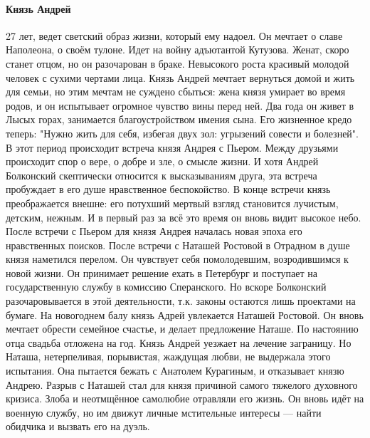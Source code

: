 \documentclass{article}
\begin{document}
\paragraph{Князь Андрей}
27 лет, ведет светский образ жизни, который ему надоел. Он мечтает о славе Наполеона, о своём тулоне.
Идет на войну адъютантой Кутузова. Женат, скоро станет отцом, но он разочарован в браке. Невысокого роста
красивый молодой человек с сухими чертами лица. Князь Андрей мечтает вернуться домой и жить для семьи, но
этим мечтам не суждено сбыться: жена князя умирает во время родов, и он испытывает огромное чувство вины перед ней.
Два года он живет в Лысых горах, занимается благоустройством имения сына. Его жизненное кредо теперь:
"Нужно жить для себя, избегая двух зол: угрызений совести и болезней". В этот период происходит встреча князя
Андрея с Пьером. Между друзьями происходит спор о вере, о добре и зле, о смысле жизни. И хотя Андрей Болконский
скептически относится к высказываниям друга, эта встреча пробуждает в его душе нравственное беспокойство.
В конце встречи князь преображается внешне: его потухший мертвый взгляд становится лучистым, детским, нежным.
И в первый раз за всё это время он вновь видит высокое небо. После встречи с Пьером для князя Андрея началась
новая эпоха его нравственных поисков. После встречи с Наташей Ростовой в Отрадном в душе князя наметился перелом.
Он чувствует себя помолодевшим, возродившимся к новой жизни. Он принимает решение ехать в Петербург и поступает
на государственную службу в комиссию Сперанского. Но вскоре Болконский разочаровывается в этой деятельности, т.к.
законы остаются лишь проектами на бумаге. На новогоднем балу князь Адрей увлекается Наташей Ростовой.
Он вновь мечтает обрести семейное счастье, и делает предложение Наташе. По настоянию отца свадьба отложена на год.
Князь Андрей уезжает на лечение заграницу. Но Наташа, нетерпеливая, порывистая, жаждущая любви, не выдержала этого
испытания. Она пытается бежать с Анатолем Курагиным, и отказывает князю Андрею. Разрыв с Наташей стал для князя
причиной самого тяжелого духовного кризиса. Злоба и неотмщённое самолюбие отравляли его жизнь. Он вновь идёт на
военную службу, но им движут личные мстительные интересы --- найти обидчика и вызвать его на дуэль. 
\end{document}
